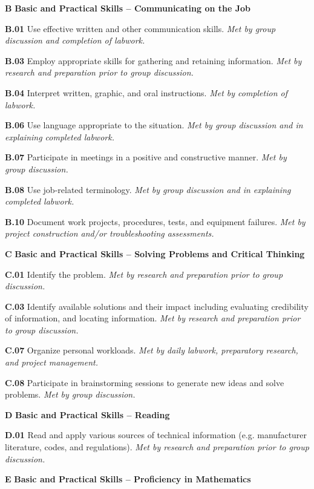 \vskip 5pt

\medskip
\item{\bf B} {\bf Basic and Practical Skills -- Communicating on the Job}
\item{\bf B.01} Use effective written and other communication skills.  {\it Met by group discussion and completion of labwork.}
\item{\bf B.03} Employ appropriate skills for gathering and retaining information.  {\it Met by research and preparation prior to group discussion.}
\item{\bf B.04} Interpret written, graphic, and oral instructions.  {\it Met by completion of labwork.}
\item{\bf B.06} Use language appropriate to the situation.  {\it Met by group discussion and in explaining completed labwork.}
\item{\bf B.07} Participate in meetings in a positive and constructive manner.  {\it Met by group discussion.}
\item{\bf B.08} Use job-related terminology.  {\it Met by group discussion and in explaining completed labwork.}
\item{\bf B.10} Document work projects, procedures, tests, and equipment failures.  {\it Met by project construction and/or troubleshooting assessments.}
\item{\bf C} {\bf Basic and Practical Skills -- Solving Problems and Critical Thinking}
\item{\bf C.01} Identify the problem.  {\it Met by research and preparation prior to group discussion.}
\item{\bf C.03} Identify available solutions and their impact including evaluating credibility of information, and locating information.  {\it Met by research and preparation prior to group discussion.}
\item{\bf C.07} Organize personal workloads.  {\it Met by daily labwork, preparatory research, and project management.}
\item{\bf C.08} Participate in brainstorming sessions to generate new ideas and solve problems.  {\it Met by group discussion.}
\item{\bf D} {\bf Basic and Practical Skills -- Reading}
\item{\bf D.01} Read and apply various sources of technical information (e.g. manufacturer literature, codes, and regulations).  {\it Met by research and preparation prior to group discussion.}
\item{\bf E} {\bf Basic and Practical Skills -- Proficiency in Mathematics}
